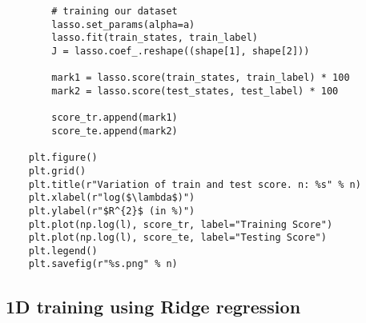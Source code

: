 \begin{verbatim}
        # training our dataset
        lasso.set_params(alpha=a)
        lasso.fit(train_states, train_label)
        J = lasso.coef_.reshape((shape[1], shape[2]))

        mark1 = lasso.score(train_states, train_label) * 100
        mark2 = lasso.score(test_states, test_label) * 100

        score_tr.append(mark1)
        score_te.append(mark2)

    plt.figure()
    plt.grid()
    plt.title(r"Variation of train and test score. n: %s" % n)
    plt.xlabel(r"log($\lambda$)")
    plt.ylabel(r"$R^{2}$ (in %)")
    plt.plot(np.log(l), score_tr, label="Training Score")
    plt.plot(np.log(l), score_te, label="Testing Score")
    plt.legend()
    plt.savefig(r"%s.png" % n)
\end{verbatim}

\subsection{1D training using Ridge regression}

